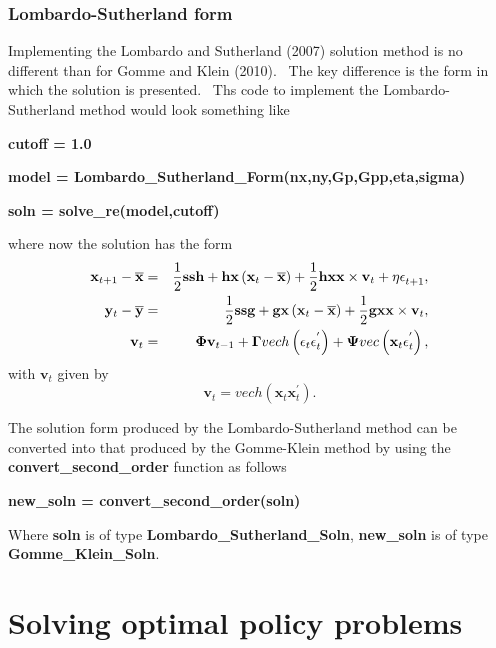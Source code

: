 \documentclass[thmsa,notitlepage,11pt]{article}
\begin{document}
\subsubsection{Lombardo-Sutherland form}

Implementing the Lombardo and Sutherland (2007) solution method is no
different than for Gomme and Klein (2010). \ The key difference is the form
in which the solution is presented. \ Ths code to implement the
Lombardo-Sutherland method would look something like

\bigskip

\textbf{cutoff = 1.0}

\textbf{model = Lombardo\_Sutherland\_Form(nx,ny,Gp,Gpp,eta,sigma)}

\textbf{soln = solve\_re(model,cutoff)}

\bigskip

where now the solution has the form%
\begin{eqnarray*}
\mathbf{x}_{t+1}-\overline{\mathbf{x}} &=&\frac{1}{2}\mathbf{ssh}+\mathbf{hx}%
\left( \mathbf{x}_{t}-\overline{\mathbf{x}}\right) +\frac{1}{2}\mathbf{hxx}%
\times \mathbf{v}_{t}+\mathbf{\eta \epsilon }_{t+1}, \\
\mathbf{y}_{t}-\overline{\mathbf{y}} &=&\frac{1}{2}\mathbf{ssg}+\mathbf{gx}%
\left( \mathbf{x}_{t}-\overline{\mathbf{x}}\right) +\frac{1}{2}\mathbf{gxx}%
\times \mathbf{v}_{t}, \\
\mathbf{v}_{t} &=&\mathbf{\Phi v}_{t-1}+\mathbf{\Gamma }vech\left( \mathbf{%
\epsilon }_{t}\mathbf{\epsilon }_{t}^{^{\prime }}\right) +\mathbf{\Psi }%
vec\left( \mathbf{x}_{t}\mathbf{\epsilon }_{t}^{^{\prime }}\right) ,
\end{eqnarray*}%
with $\mathbf{v}_{t}$ given by%
\[
\mathbf{v}_{t}=vech\left( \mathbf{x}_{t}\mathbf{x}_{t}^{\prime }\right) . 
\]

The solution form produced by the Lombardo-Sutherland method can be
converted into that produced by the Gomme-Klein method by using the \textbf{%
convert\_second\_order} function as follows

\bigskip

\textbf{new\_soln = convert\_second\_order(soln)}

\bigskip

Where \textbf{soln} is of type \textbf{Lombardo\_Sutherland\_Soln}, \textbf{%
new\_soln} is of type \textbf{Gomme\_Klein\_Soln}.

\section{Solving optimal policy problems}
\end{document}
